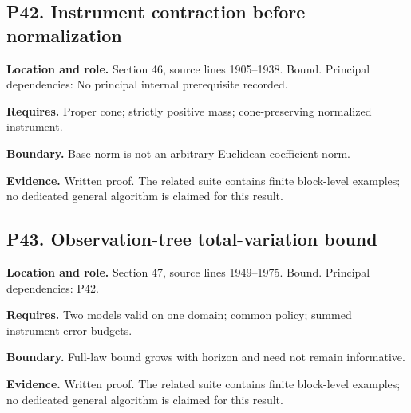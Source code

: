 \documentclass[11pt,letterpaper]{article}
\begin{document}
\par\noindent\begin{minipage}{\textwidth}
\subsection{P42. Instrument contraction before
normalization}\label{p42.-instrument-contraction-before-normalization}

\textbf{Location and role.} Section 46, source lines 1905--1938. Bound.
Principal dependencies: No principal internal prerequisite recorded.

\textbf{Requires.} Proper cone; strictly positive mass; cone-preserving
normalized instrument.

\textbf{Boundary.} Base norm is not an arbitrary Euclidean coefficient
norm.

\textbf{Evidence.} Written proof. The related suite contains finite
block-level examples; no dedicated general algorithm is claimed for this
result.
\end{minipage}\par\medskip

\par\noindent\begin{minipage}{\textwidth}
\subsection{P43. Observation-tree total-variation
bound}\label{p43.-observation-tree-total-variation-bound}

\textbf{Location and role.} Section 47, source lines 1949--1975. Bound.
Principal dependencies: P42.

\textbf{Requires.} Two models valid on one domain; common policy; summed
instrument-error budgets.

\textbf{Boundary.} Full-law bound grows with horizon and need not remain
informative.

\textbf{Evidence.} Written proof. The related suite contains finite
block-level examples; no dedicated general algorithm is claimed for this
result.
\end{minipage}\par\medskip
\end{document}
